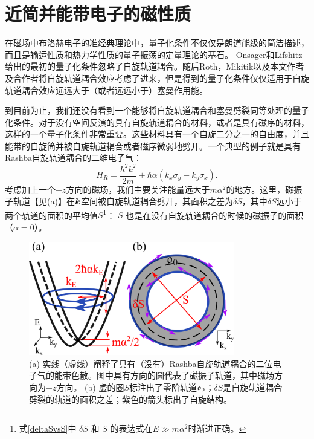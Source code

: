 \chapter{近简并能带电子的磁性质}

在磁场中布洛赫电子的准经典理论中，量子化条件不仅仅是朗道能级的简洁描述，而且是输运性质\cite{SdH}和热力学性质\cite{dHvA}的量子振荡的定量理论的基石。 Onsager\cite{Onsager}和Lifshitz\cite{lifshitz_kosevich,lifshitz_kosevich_jetp}给出的最初的量子化条件忽略了自旋轨道耦合。随后Roth\cite{rotheffham,rothmag}，Mikitik\cite{Mikitik_quantizationrule}以及本文作者及合作者\cite{topoferm,100p}将自旋轨道耦合效应考虑了进来，但是得到的量子化条件仅仅适用于自旋轨道耦合效应远远大于（或者远远小于）塞曼作用能。


到目前为止，我们还没有看到一个能够将自旋轨道耦合和塞曼劈裂同等处理的量子化条件。对于没有空间反演的具有自旋轨道耦合的材料，或者是具有磁序的材料，这样的一个量子化条件非常重要。这些材料具有一个自旋二分之一的自由度，并且能带的自旋简并被自旋轨道耦合或者磁序微弱地劈开。一个典型的例子就是具有Rashba自旋轨道耦合的二维电子气：
\begin{equation}
H_R=\frac{{\hbar^2} k^2}{2m}+\hbar\alpha  (k_{x}\sigma_{y}-k_{y}\sigma_{x}).\label{eq:Rashba-Hamiltonian}
\end{equation}
考虑加上一个$-z$方向的磁场，我们主要关注能量远大于$m\alpha^2$的地方。这里，磁振子轨道【见(a)】在$\boldsymbol{k}$空间被自旋轨道耦合劈开，其面积之差为$\delta S$，其中$\delta S$远小于两个轨道的面积的平均值$S$\footnote{式\ref{deltaSvsS}中 $\delta S$ 和 $S$ 的表达式在$E{\gg}m\alpha^2$时渐进正确。}：
$S$ 也是在没有自旋轨道耦合的时候的磁振子的面积（$\alpha{=}0$）。

\begin{figure}
	\includegraphics[width=0.8\textwidth]{../figures/orbits.png}
	\centering
	\caption{(a) 实线（虚线）阐释了具有（没有）Rashba自旋轨道耦合的二位电子气的能带色散。图中具有方向的圆代表了磁振子轨道，其中磁场方向为$-z$方向。 (b) 虚的圈$S$标注出了零阶轨道$\mathfrak{o}_0$；$\delta S$是自旋轨道耦合劈裂的轨道的面积之差；紫色的箭头标出了自旋结构。\label{fig:orbits}}
\end{figure}

